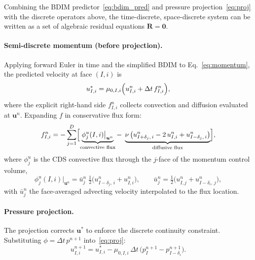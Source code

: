\documentclass[11pt]{article}
\newcommand{\vect}[1]{\bm{#1}}
\begin{document}
Combining the BDIM predictor~\eqref{eq:bdim_pred} and pressure
projection~\eqref{eq:proj} with the discrete operators above, the
time-discrete, space-discrete system can be written as a set of
algebraic residual equations $\vect{R} = \vect{0}$.

\paragraph{Semi-discrete momentum (before projection).}
Applying forward Euler in time and the simplified BDIM to
Eq.~\eqref{eq:momentum}, the predicted velocity at face $(I,i)$ is
\begin{equation}\label{eq:disc_pred}
  u^{*}_{I,i}
  = \mu_{0,I,i}\Bigl(
      u^{n}_{I,i}
      + \Delta t\,f^{n}_{I,i}
    \Bigr),
\end{equation}
where the explicit right-hand side $f^{n}_{I,i}$ collects convection
and diffusion evaluated at $\vect{u}^n$.  Expanding $f$ in conservative
flux form:
\begin{equation}\label{eq:disc_rhs}
  f^{n}_{I,i}
  = -\sum_{j=1}^{D}\Bigl[
      \underbrace{%
        \phi^{u}_{j}(I,i)\big|_{\vect{u}^n}
      }_{\text{convective flux}}
      -\;
      \underbrace{%
        \nu\,\bigl(u^{n}_{I+\delta_j,\,i} - 2\,u^{n}_{I,i} + u^{n}_{I-\delta_j,\,i}\bigr)
      }_{\text{diffusive flux}}
    \Bigr],
\end{equation}
where $\phi^{u}_{j}$ is the CDS convective flux through the $j$-face
of the momentum control volume,
\begin{equation}
  \phi^{u}_{j}(I,i)\big|_{\vect{u}^n}
  = \bar{u}^{n}_{j}\;\tfrac{1}{2}\bigl(u^{n}_{I-\delta_j,\,i} + u^{n}_{I,i}\bigr),
  \qquad
  \bar{u}^{n}_{j} = \tfrac{1}{2}\bigl(u^{n}_{I,j} + u^{n}_{I-\delta_i,\,j}\bigr),
\end{equation}
with $\bar{u}^{n}_{j}$ the face-averaged advecting velocity
interpolated to the flux location.

\paragraph{Pressure projection.}
The projection corrects $\vect{u}^*$ to enforce the discrete continuity
constraint.  Substituting $\phi = \Delta t\,p^{n+1}$
into~\eqref{eq:proj}:
\begin{equation}\label{eq:disc_proj}
  u^{n+1}_{I,i}
  = u^{*}_{I,i}
  - \mu_{0,I,i}\,\Delta t\,\bigl(p^{n+1}_{I} - p^{n+1}_{I-\delta_i}\bigr).
\end{equation}
\end{document}
